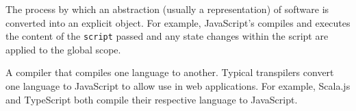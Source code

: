 \begin{definition}[Reification]
The process by which an abstraction (usually a  representation) of software is converted into an explicit object. For example, JavaScript's  compiles and executes the content of the \verb|script| passed and any state changes within the script are applied to the global scope.
\end{definition}

\begin{definition}[Transpiler]
    A compiler that compiles one language to another. Typical transpilers convert one language to JavaScript to allow use in web applications. For example, Scala.js and TypeScript both compile their respective language to JavaScript.
\end{definition}